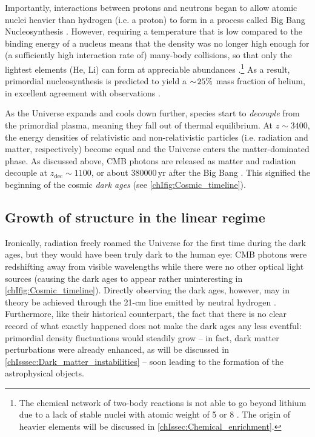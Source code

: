 Importantly, interactions between protons and neutrons began to allow atomic nuclei heavier than hydrogen (i.e. a proton) to form in a process called Big Bang Nucleosynthesis \citep[BBN; work on this was pioneered by][]{1949RvMP...21..367G}. However, requiring a temperature that is low compared to the binding energy of a nucleus means that the density was no longer high enough for (a sufficiently high interaction rate of) many-body collisions, so that only the lightest elements (He, Li) can form at appreciable abundances \citep{1967ApJ...148....3W}.\footnote{The chemical network of two-body reactions is not able to go beyond lithium due to a lack of stable nuclei with atomic weight of 5 or 8 \citep[e.g.][]{2010gfe..book.....M}. The origin of heavier elements will be discussed in \cref{chIssec:Chemical_enrichment}.} As a result, primordial nucleosynthesis is predicted to yield a $\sim \! 25\%$ mass fraction of helium, in excellent agreement with observations \citep[and hence considered a key validation of the Big Bang theory;][]{2016RvMP...88a5004C}.

As the Universe expands and cools down further, species start to \textit{decouple} from the primordial plasma, meaning they fall out of thermal equilibrium. At $z \sim 3400$, the energy densities of relativistic and non-relativistic particles (i.e. radiation and matter, respectively) become equal and the Universe enters the matter-dominated phase. As discussed above, CMB photons are released as matter and radiation decouple at $z_\text{dec} \sim 1100$, or about $\num{380000} \, \mathrm{yr}$ after the Big Bang \citep{2010gfe..book.....M}. This signified the beginning of the cosmic \textit{dark ages} (see \cref{chIfig:Cosmic_timeline}).

\subsection{Growth of structure in the linear regime}
\label{chIssec:Growt_of_structure_in_the_linear_regime}

Ironically, radiation freely roamed the Universe for the first time during the dark ages, but they would have been truly dark to the human eye: CMB photons were redshifting away from visible wavelengths while there were no other optical light sources (causing the dark ages to appear rather uninteresting in \cref{chIfig:Cosmic_timeline}). Directly observing the dark ages, however, may in theory be achieved through the 21-cm line emitted by neutral hydrogen \citep[e.g.][]{2006PhR...433..181F}. Furthermore, like their historical counterpart, the fact that there is no clear record of what exactly happened does not make the dark ages any less eventful: primordial density fluctuations would steadily grow -- in fact, dark matter perturbations were already enhanced, as will be discussed in \cref{chIsssec:Dark_matter_instabilities} -- soon leading to the formation of the astrophysical objects.

